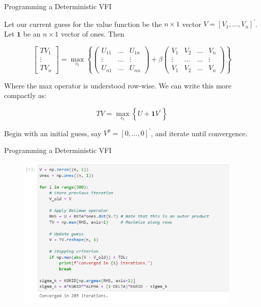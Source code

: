 \documentclass[11pt, xcolor={dvipsnames}, hyperref={colorlinks, allcolors=Blue}]{beamer}
\begin{document}
\begin{frame}{Programming a Deterministic VFI}

Let our current guess for the value function be the $n\times 1$ vector $V = [V_1, \dots, V_n]^{\prime}$. Let $\mathbf{1}$ be an $n \times 1$ vector of ones. Then

\[
\begin{bmatrix}TV_{1} \\ \vdots \\ TV_{n} \end{bmatrix}
=
\underset{c_{t}}{\max} \left\{
	 \begin{pmatrix} U_{11} & \dots & U_{1 n}\\ \vdots & \dots & \vdots \\ U_{n1} & \dots & U_{nn} \end{pmatrix}  	
	+ \beta \begin{pmatrix} V_{1} & V_{2}& \dots & V_{n} \\ \vdots & \dots & \dots & \vdots \\ V_{1} & V_{2} & \dots & V_{n}  \end{pmatrix}  
	\right\}
 \]
\bigskip

Where the max operator is understood row-wise. We can write this more compactly as:

\[TV = \underset{c_{t}}{\max} \left\{U + \mathbf{1}V^{\prime} \right\}\]
\medskip

Begin with an initial guess, say $V^{0} = [0, \dots, 0]^{\prime}$, and iterate until convergence. 
\end{frame}

\begin{frame}{Programming a Deterministic VFI}
\begin{figure}
	\includegraphics[width=0.95\textwidth]{Code4.png}
	\hfill
\end{figure}
\end{frame}
\end{document}
